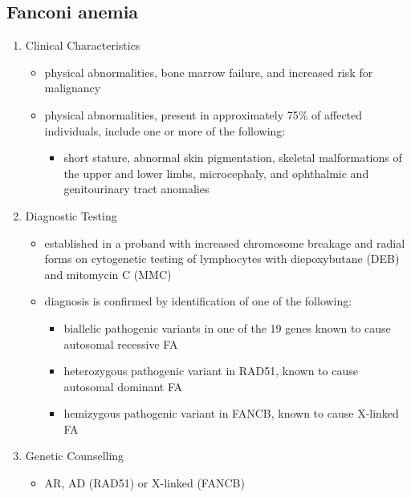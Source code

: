 \documentclass[12pt]{scrartcl}
\begin{document}
\subsection{Fanconi anemia}
\label{sec:org6cc4f43}
\begin{enumerate}
\item Clinical Characteristics
\label{sec:orgd04f56a}
\begin{itemize}
\item physical abnormalities, bone marrow failure, and increased risk for
malignancy
\item physical abnormalities, present in approximately 75\% of affected individuals, include one or more of the following:
\begin{itemize}
\item short stature, abnormal skin pigmentation, skeletal malformations
of the upper and lower limbs, microcephaly, and ophthalmic and
genitourinary tract anomalies
\end{itemize}
\end{itemize}

\item Diagnostic Testing
\label{sec:orgf2c4970}
\begin{itemize}
\item established in a proband with increased chromosome breakage and
radial forms on cytogenetic testing of lymphocytes with
diepoxybutane (DEB) and mitomycin C (MMC)

\item diagnosis is confirmed by identification of one of the following:
\begin{itemize}
\item biallelic pathogenic variants in one of the 19 genes known to
cause autosomal recessive FA
\item heterozygous pathogenic variant in RAD51, known to cause autosomal dominant FA
\item hemizygous pathogenic variant in FANCB, known to cause X-linked FA
\end{itemize}
\end{itemize}

\item Genetic Counselling
\label{sec:org187b00d}
\begin{itemize}
\item AR, AD (RAD51) or X-linked (FANCB)
\end{itemize}
\end{enumerate}
\end{document}
